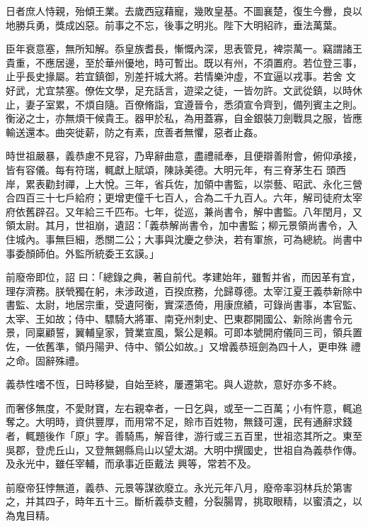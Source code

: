 \begin{pinyinscope}
 日者庶人恃親，殆傾王業。去歲西寇藉寵，幾敗皇基。不圖襄楚，復生今釁，良以地勝兵勇，獎成凶惡。前事之不忘，後事之明兆。陛下大明紹祚，垂法萬葉。



 臣年衰意塞，無所知解。忝皇族耆長，慚慨內深，思表管見，裨崇萬一。竊謂諸王貴重，不應居邊，至於華州優地，時可暫出。既以有州，不須置府。若位登三事，止乎長史掾屬。若宜鎮御，別差扞城大將。若情樂沖虛，不宜逼以戎事。若舍
 文好武，尤宜禁塞。僚佐文學，足充話言，遊梁之徒，一皆勿許。文武從鎮，以時休止，妻子室累，不煩自隨。百僚脩詣，宜遵晉令，悉須宣令齊到，備列賓主之則。衡泌之士，亦無煩干候貴王。器甲於私，為用蓋寡，自金銀裝刀劍戰具之服，皆應輸送還本。曲突徙薪，防之有素，庶善者無懼，惡者止姦。



 時世祖嚴暴，義恭慮不見容，乃卑辭曲意，盡禮祗奉，且便辯善附會，俯仰承接，皆有容儀。每有符瑞，輒獻上賦頌，陳詠美德。大明元年，有三脊茅生石
 頭西岸，累表勸封禪，上大悅。三年，省兵佐，加領中書監，以崇藝、昭武、永化三營合四百三十七戶給府；更增吏僮千七百人，合為二千九百人。六年，解司徒府太宰府依舊辟召。又年給三千匹布。七年，從巡，兼尚書令，解中書監。八年閏月，又領太尉。其月，世祖崩，遺詔：「義恭解尚書令，加中書監；柳元景領尚書令，入住城內。事無巨細，悉關二公；大事與沈慶之參決，若有軍旅，可為總統。尚書中事委顏師伯。外監所統委王玄謨。」



 前廢帝即位，詔
 曰：「總錄之典，著自前代。孝建始年，雖暫并省，而因革有宜，理存濟務。朕煢獨在躬，未涉政道，百揆庶務，允歸尊德。太宰江夏王義恭新除中書監、太尉，地居宗重，受遺阿衡，實深憑倚，用康庶績，可錄尚書事，本官監、太宰、王如故；侍中、驃騎大將軍、南兗州刺史、巴東郡開國公、新除尚書令元景，同稟顧誓，翼輔皇家，贊業宣風，繄公是賴。可即本號開府儀同三司，領兵置佐，一依舊準，領丹陽尹、侍中、領公如故。」又增義恭班劍為四十人，更申殊
 禮之命。固辭殊禮。



 義恭性嗜不恆，日時移變，自始至終，屢遷第宅。與人遊款，意好亦多不終。



 而奢侈無度，不愛財寶，左右親幸者，一日乞與，或至一二百萬；小有忤意，輒追奪之。大明時，資供豐厚，而用常不足，賒市百姓物，無錢可還，民有通辭求錢者，輒題後作「原」字。善騎馬，解音律，游行或三五百里，世祖恣其所之。東至吳郡，登虎丘山，又登無錫縣烏山以望太湖。大明中撰國史，世祖自為義恭作傳。及永光中，雖任宰輔，而承事近臣戴法
 興等，常若不及。



 前廢帝狂悖無道，義恭、元景等謀欲廢立。永光元年八月，廢帝率羽林兵於第害之，并其四子，時年五十三。斷析義恭支體，分裂腸胃，挑取眼精，以蜜漬之，以為鬼目精。




\end{pinyinscope}
